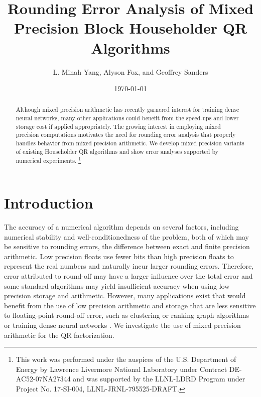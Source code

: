 \documentclass[review,onefignum,onetabnum]{siamart190516}
\title{Rounding Error Analysis of Mixed Precision Block Householder QR Algorithms}
\author{L. Minah Yang, Alyson Fox, and Geoffrey Sanders}
\date{\today}
\newcommand\blfootnote[1]{%
	\begingroup
	\renewcommand\thefootnote{}\footnote{#1}%
	\addtocounter{footnote}{-1}%
	\endgroup
}
\begin{document}
\maketitle
\begin{abstract}
	Although mixed precision arithmetic has recently garnered interest for training dense neural networks, many other applications could benefit from the  speed-ups and lower storage cost if applied appropriately. 
	The growing interest in employing mixed precision computations motivates the need for rounding error analysis that properly handles behavior from mixed precision arithmetic.
	We develop mixed precision variants of existing Householder QR algorithms and show error analyses supported by numerical experiments.	\blfootnote{This work was performed under the auspices of the U.S. Department of Energy by Lawrence Livermore National Laboratory under Contract DE-AC52-07NA27344 and was supported by the LLNL-LDRD Program under Project No. 17-SI-004, LLNL-JRNL-795525-DRAFT.}
\end{abstract}
\section{Introduction}\label{sec:intro}
%
The accuracy of a numerical algorithm depends on several factors, including numerical stability and well-conditionedness of the problem, both of which may be sensitive to rounding errors, the difference between exact and finite precision arithmetic. 
Low precision floats use fewer bits than high precision floats to represent the real numbers and naturally incur larger rounding errors. 
Therefore, error attributed to round-off may have a larger influence over the total error and some standard algorithms may yield insufficient accuracy when using low precision storage and arithmetic.
However, many applications exist that would benefit from the use of low precision arithmetic and storage that are less sensitive to floating-point round-off error, such as clustering or ranking graph algorithms \cite{vonLuxburg2007} or training dense neural networks \cite{micikevicius2018mixed}.
We investigate the use of mixed precision arithmetic for the QR factorization.
\par
\end{document}
